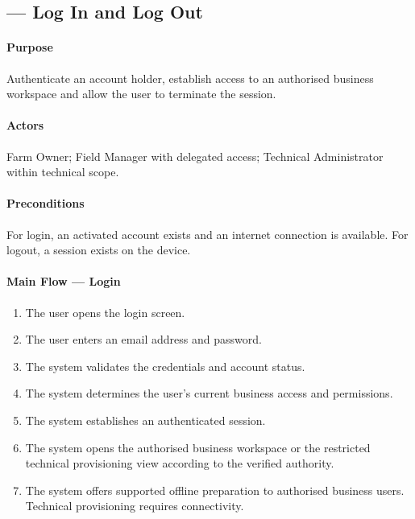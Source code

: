 \subsection{ --- Log In and Log Out}
\label{uc:login-logout}
\label{uc:02}

\paragraph{Purpose}

Authenticate an account holder, establish access to
    an authorised business workspace and allow the user
    to terminate the session.

\paragraph{Actors}

Farm Owner; Field Manager with delegated access; Technical Administrator within technical scope.

\paragraph{Preconditions}

For login, an activated account exists and an
    internet connection is available.
    For logout, a session exists on the device.

\paragraph{Main Flow --- Login}

\begin{enumerate}
        \item The user opens the login screen.
        \item The user enters an email address and password.
        \item The system validates the credentials and
        account status.
        \item The system determines the user's current
        business access and permissions.
        \item The system establishes an authenticated session.
        \item The system opens the authorised business workspace or the restricted technical provisioning view according to the verified authority.
        \item The system offers supported offline preparation to authorised business users. Technical provisioning requires connectivity.
    \end{enumerate}

